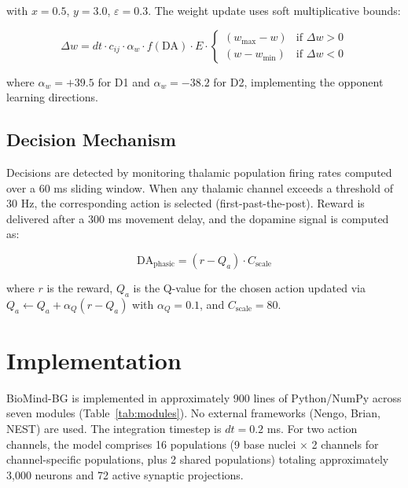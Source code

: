 \documentclass[11pt,a4paper]{article}
\begin{document}
with $x = 0.5$, $y = 3.0$, $\varepsilon = 0.3$. The weight update uses soft multiplicative bounds:

\begin{equation}
\Delta w = dt \cdot c_{ij} \cdot \alpha_w \cdot f(\text{DA}) \cdot E \cdot \begin{cases} (w_{\max} - w) & \text{if } \Delta w > 0 \\ (w - w_{\min}) & \text{if } \Delta w < 0 \end{cases}
\end{equation}

where $\alpha_w = +39.5$ for D1 and $\alpha_w = -38.2$ for D2, implementing the opponent learning directions.

\subsection{Decision Mechanism}

Decisions are detected by monitoring thalamic population firing rates computed over a 60 ms sliding window. When any thalamic channel exceeds a threshold of 30 Hz, the corresponding action is selected (first-past-the-post). Reward is delivered after a 300 ms movement delay, and the dopamine signal is computed as:

\begin{equation}
\text{DA}_{\text{phasic}} = (r - Q_a) \cdot C_{\text{scale}}
\end{equation}

where $r$ is the reward, $Q_a$ is the Q-value for the chosen action updated via $Q_a \leftarrow Q_a + \alpha_Q(r - Q_a)$ with $\alpha_Q = 0.1$, and $C_{\text{scale}} = 80$.

\section{Implementation}

BioMind-BG is implemented in approximately 900 lines of Python/NumPy across seven modules (Table~\ref{tab:modules}). No external frameworks (Nengo, Brian, NEST) are used. The integration timestep is $dt = 0.2$ ms. For two action channels, the model comprises 16 populations (9 base nuclei $\times$ 2 channels for channel-specific populations, plus 2 shared populations) totaling approximately 3,000 neurons and 72 active synaptic projections.
\end{document}

